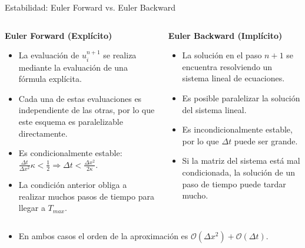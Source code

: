 \documentclass[handout]{beamer}
\begin{document}
\begin{frame}{Estabilidad: Euler Forward vs. Euler Backward}

\begin{small}

\begin{columns}
\begin{column}{0.45\textwidth}
\textbf{Euler Forward (Expl\'icito)}

\begin{itemize}[<+->]
\item La evaluaci\'on de $u_i^{n+1}$ se realiza mediante la evaluaci\'on de una f\'ormula expl\'icita.
\item Cada una de estas evaluaciones es independiente de las otras, por lo que este esquema es paralelizable directamente.
\item Es condicionalmente estable: $\frac{\Delta t}{\Delta x^2} \kappa < \frac{1}{2} \Longrightarrow \Delta t < \frac{\Delta x^2}{2 \kappa}$.
\item La condici\'on anterior obliga a realizar muchos pasos de tiempo para llegar a $T_{max}$.
\end{itemize}
\end{column}
\begin{column}{0.45\textwidth}
\textbf{Euler Backward (Impl\'icito)}
\begin{itemize}[<+->]
\item La soluci\'on en el paso $n+1$ se encuentra resolviendo un sistema lineal de ecuaciones.
\item Es posible paralelizar la soluci\'on del sistema lineal.
\item Es incondicionalmente estable, por lo que $\Delta t$ puede ser grande.
\item Si la matriz del sistema est\'a mal condicionada, la soluci\'on de un paso de tiempo puede tardar mucho.
\end{itemize}
\end{column}
\end{columns}

\begin{itemize}[<+->]
\item En ambos casos el orden de la aproximaci\'on es $\mathcal{O}(\Delta x^2) + \mathcal{O}(\Delta t)$.
\end{itemize}
\end{small}

\end{frame}
\end{document}
